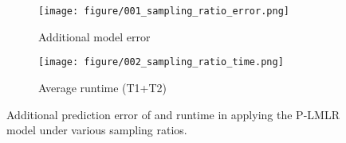 % 	


\begin{figure}[tp]
	\begin{subfigure}[]{0.48\columnwidth}
		\texttt{[image: figure/001\_sampling\_ratio\_error.png]}
		\caption{Additional model error}
		\label{fig:eval_smapling_error_error}
	\end{subfigure}
	\begin{subfigure}[]{0.48\columnwidth}
 		\texttt{[image: figure/002\_sampling\_ratio\_time.png]}
 		\caption{Average runtime (T1+T2)}
 		\label{fig:eval_smapling_error_time}
	\end{subfigure}
	\vspace{-0.1in}
	\caption{Additional prediction error of and runtime in applying the P-LMLR model under various
          sampling ratios.}
	\label{fig:smapling_error}
    \vspace{-0.1in}
\end{figure}

